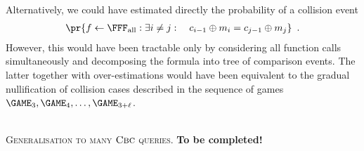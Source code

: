 \documentclass{crypto-exercise}
\begin{document}
\begin{solution}
Alternatively, we could have estimated directly the probability of a collision event
\begin{align*}
\pr{f\gets\FFFALL:\exists i\neq j:\quad c_{i-1} \oplus m_i  = c_{j-1} \oplus m_{j}} \enspace.
\end{align*}
However, this would have been tractable only by considering all function calls simultaneously and decomposing the formula into tree of comparison events. The latter together with over-estimations would have been equivalent to the gradual nullification of collision cases described in the sequence of games $\GAME_3, \GAME_4, \ldots, \GAME_{3+\ell}$. 

\ \\
  
\noindent
\textsc{Generalisation to many $\textsc{Cbc}$ queries.}
\textbf{To be completed!}
\end{solution}
\end{document}
